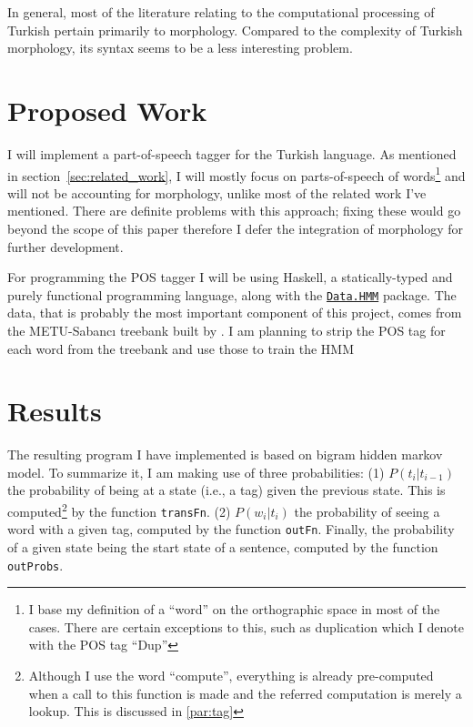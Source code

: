 \documentclass{article}
\newcommand{\hmmURL}{https://hackage.haskell.org/package/hmm-0.2.1.1/docs/Data-HMM.html}
\begin{document}
In general, most of the literature relating to the computational processing of
Turkish pertain primarily to morphology. Compared to the complexity of Turkish
morphology, its syntax seems to be a less interesting problem.

\section{Proposed Work}

I will implement a part-of-speech tagger for the Turkish language. As mentioned
in section~\ref{sec:related_work}, I will mostly focus on parts-of-speech of
words\footnote{I base my definition of a ``word'' on the orthographic space in
  most of the cases. There are certain exceptions to this, such as duplication
  which I denote with the POS tag ``Dup''} and will not be accounting for
morphology, unlike most of the related work I've mentioned. There are definite
problems with this approach; fixing these would go beyond the scope of this
paper therefore I defer the integration of morphology for further development.

For programming the POS tagger I will be using Haskell, a statically-typed and
purely functional programming language, along with the
\href{\hmmURL}{\texttt{Data.HMM}} package. The data, that is probably the most
important component of this project, comes from the METU-Sabanc{\i} treebank
built by \citet{oflazer2003building}. I am planning to strip the POS tag for
each word from the treebank and use those to train the HMM

\section{Results}

The resulting program I have implemented is based on bigram hidden markov model.
To summarize it, I am making use of three probabilities: (1) $P(t_i | t_{i-1})$
the probability of being at a state (i.e., a tag) given the previous state. This
is computed\footnote{Although I use the word ``compute'', everything is already
  pre-computed when a call to this function is made and the referred computation
  is merely a lookup. This is discussed in \ref{par:tag}} by the function
\texttt{transFn}. (2) $P(w_i | t_i)$ the probability of seeing a word with a
given tag, computed by the function \texttt{outFn}. Finally, the probability of
a given state being the start state of a sentence, computed by the function
\texttt{outProbs}.
\end{document}
